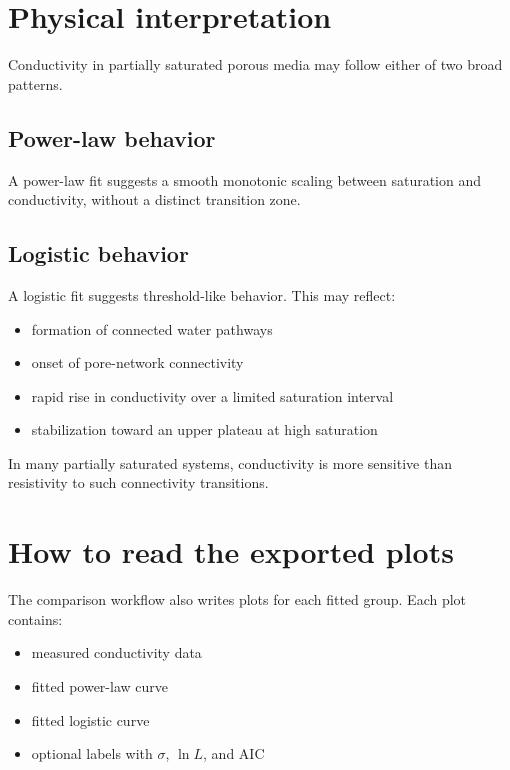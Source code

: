 \documentclass[11pt]{article}
\begin{document}
\section{Physical interpretation}

Conductivity in partially saturated porous media may follow either of two broad patterns.

\subsection{Power-law behavior}

A power-law fit suggests a smooth monotonic scaling between saturation and conductivity, without a distinct transition zone.

\subsection{Logistic behavior}

A logistic fit suggests threshold-like behavior. This may reflect:

\begin{itemize}[leftmargin=1.5em]
\item formation of connected water pathways
\item onset of pore-network connectivity
\item rapid rise in conductivity over a limited saturation interval
\item stabilization toward an upper plateau at high saturation
\end{itemize}

In many partially saturated systems, conductivity is more sensitive than resistivity to such connectivity transitions.

\section{How to read the exported plots}

The comparison workflow also writes plots for each fitted group.  
Each plot contains:

\begin{itemize}[leftmargin=1.5em]
\item measured conductivity data
\item fitted power-law curve
\item fitted logistic curve
\item optional labels with $\sigma$, $\ln L$, and AIC
\end{itemize}
\end{document}
